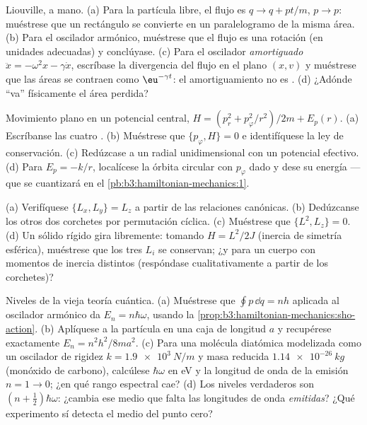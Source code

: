 \begin{exercise}[$\star\star$]\label{exo:b3:hamiltonian-mechanics:7}
Liouville, a mano. (a) Para la partícula libre, el flujo es $q \to q +
pt/m$, $p \to p$: muéstrese que un rectángulo se convierte en un
paralelogramo de la misma área. (b) Para el oscilador armónico, muéstrese
que el flujo es una rotación (en unidades adecuadas) y conclúyase. (c) Para el
oscilador \emph{amortiguado} $\ddot x = -\omega^2x - \gamma\dot x$, escríbase
la divergencia del flujo en el plano $(x, v)$ y muéstrese que las áreas se
contraen como $\eu^{-\gamma t}$: el amortiguamiento no es .
(d) ¿Adónde ``va'' físicamente el área perdida?
\end{exercise}

\begin{exercise}[$\star\star$]\label{exo:b3:hamiltonian-mechanics:8}
Movimiento plano en un potencial central, $H = (p_r^2 + p_\varphi^2/r^2)/2m
+ E_p(r)$. (a) Escríbanse las cuatro . (b) Muéstrese que $\{
p_\varphi, H\} = 0$ e identifíquese la ley de conservación. (c) Redúzcase a un
 radial unidimensional con un potencial efectivo. (d) Para
$E_p = -k/r$, localícese la órbita circular con $p_\varphi$ dado y dese su
energía --- que se cuantizará en el
\cref{pb:b3:hamiltonian-mechanics:1}.
\end{exercise}

\begin{exercise}[$\star\star$]\label{exo:b3:hamiltonian-mechanics:9}
(a) Verifíquese $\{L_x, L_y\} = L_z$ a partir de las relaciones canónicas.
(b) Dedúzcanse los otros dos corchetes por permutación cíclica. (c) Muéstrese
que $\{L^2, L_z\} = 0$. (d) Un sólido rígido gira libremente: tomando $H =
L^2/2J$ (inercia de simetría esférica), muéstrese que los tres $L_i$ se
conservan; ¿y para un cuerpo con momentos de inercia distintos (respóndase
cualitativamente a partir de los corchetes)?
\end{exercise}

\begin{exercise}[$\star\star\star$]\label{exo:b3:hamiltonian-mechanics:10}
Niveles de la vieja teoría cuántica. (a) Muéstrese que $\oint p\,\dd q = nh$
aplicada al oscilador armónico da $E_n = n\hbar\omega$, usando la
\cref{prop:b3:hamiltonian-mechanics:sho-action}. (b) Aplíquese a la
partícula en una caja de longitud $a$ y recupérese exactamente $E_n =
n^2h^2/8ma^2$. (c) Para una molécula diatómica modelizada como un oscilador
de rigidez $k = \qty{1.9e3}{N/m}$ y masa reducida $\qty{1.14e-26}
{kg}$ (monóxido de carbono), calcúlese $\hbar\omega$ en eV y la longitud de
onda de la emisión $n = 1 \to 0$; ¿en qué rango espectral cae? (d) Los
niveles verdaderos son $(n + \tfrac12)\hbar\omega$: ¿cambia ese medio que
falta las longitudes de onda \emph{emitidas}? ¿Qué experimento sí detecta
el medio del punto cero?
\end{exercise}

